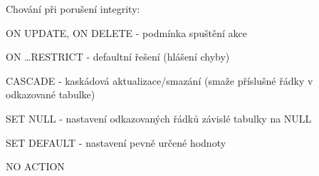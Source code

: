 Chování při porušení integrity:
\begin{pitemize}
	\item ON UPDATE, ON DELETE - podmínka spuštění akce
	\item ON \dots RESTRICT - defaultní řešení (hlášení chyby)
	\item CASCADE - kaskádová aktualizace/smazání (smaže příslušné řádky v odkazované tabulke)
	\item SET NULL - nastavení odkazovaných řádků závislé tabulky na NULL
	\item SET DEFAULT - nastavení pevně určené hodnoty
	\item NO ACTION 
\end{pitemize}
